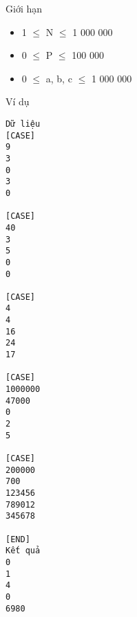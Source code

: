 Giới hạn
\begin{itemize}
	\item     1  $\le$  N  $\le$  1 000 000   
	\item     0  $\le$  P  $\le$  100 000   
	\item     0  $\le$  a, b, c  $\le$  1 000 000   
\end{itemize}
Ví dụ
\begin{verbatim}
Dữ liệu
[CASE]
9
3
0
3
0

[CASE]
40
3
5
0
0

[CASE]
4
4
16
24
17
    	
[CASE]
1000000
47000
0
2
5

[CASE]
200000
700
123456
789012
345678

[END]
Kết quả
0
1
4
0
6980
\end{verbatim}